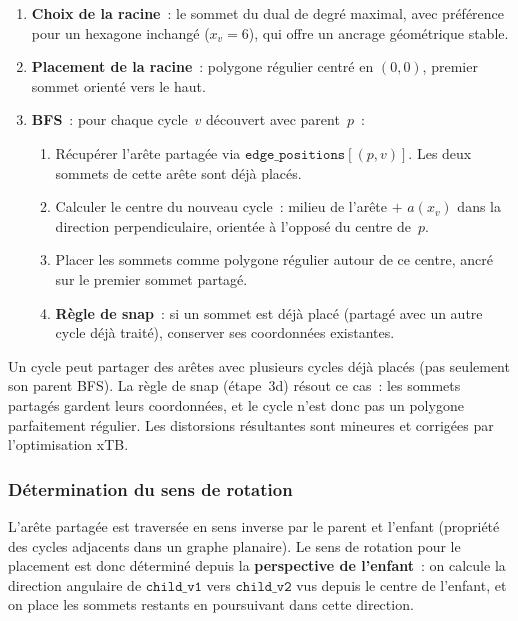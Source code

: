 \documentclass[12pt,a4paper]{article}
\theoremstyle{definition}
\theoremstyle{remark}
\begin{document}
\begin{enumerate}[nosep]
  \item \textbf{Choix de la racine}~: le sommet du dual de degr\'e
        maximal, avec pr\'ef\'erence pour un hexagone inchang\'e
        ($x_v = 6$), qui offre un ancrage g\'eom\'etrique stable.
  \item \textbf{Placement de la racine}~: polygone r\'egulier centr\'e
        en $(0, 0)$, premier sommet orient\'e vers le haut.
  \item \textbf{BFS}~: pour chaque cycle~$v$ d\'ecouvert avec parent~$p$~:
        \begin{enumerate}[nosep,label=(\alph*)]
          \item R\'ecup\'erer l'ar\^ete partag\'ee via
                $\texttt{edge\_positions}[(p, v)]$. Les deux sommets de
                cette ar\^ete sont d\'ej\`a plac\'es.
          \item Calculer le centre du nouveau cycle~:
                milieu de l'ar\^ete $+$ $a(x_v)$ dans la direction
                perpendiculaire, orient\'ee \`a l'oppos\'e du centre de~$p$.
          \item Placer les sommets comme polygone r\'egulier autour de ce
                centre, ancr\'e sur le premier sommet partag\'e.
          \item \textbf{R\`egle de snap}~: si un sommet est d\'ej\`a
                plac\'e (partag\'e avec un autre cycle d\'ej\`a trait\'e),
                conserver ses coordonn\'ees existantes.
        \end{enumerate}
\end{enumerate}

\begin{notebox}
Un cycle peut partager des ar\^etes avec plusieurs cycles d\'ej\`a plac\'es
(pas seulement son parent BFS). La r\`egle de snap (\'etape~3d) r\'esout
ce cas~: les sommets partag\'es gardent leurs coordonn\'ees, et le cycle
n'est donc pas un polygone parfaitement r\'egulier. Les distorsions
r\'esultantes sont mineures et corrig\'ees par l'optimisation xTB.
\end{notebox}

\subsubsection{D\'etermination du sens de rotation}

L'ar\^ete partag\'ee est travers\'ee en sens inverse par le parent et
l'enfant (propri\'et\'e des cycles adjacents dans un graphe planaire).
Le sens de rotation pour le placement est donc d\'etermin\'e depuis la
\textbf{perspective de l'enfant}~: on calcule la direction angulaire de
$\texttt{child\_v1}$ vers $\texttt{child\_v2}$ vus depuis le centre de
l'enfant, et on place les sommets restants en poursuivant dans cette
direction.
\end{document}
